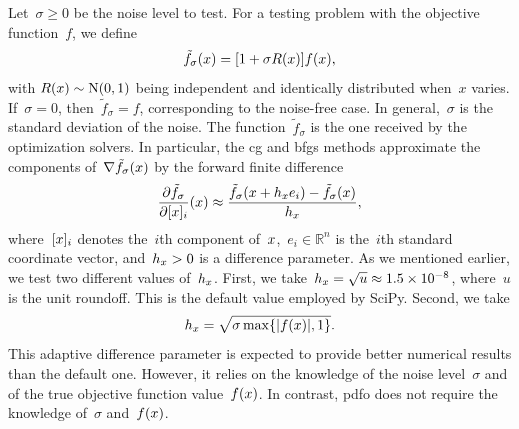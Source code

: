 \documentclass[
    smallextended,  %
    final,          %
]{svjour3}
\newcommand{\abs}[2][]{#1\lvert#2#1\rvert}
\newcommand{\set}[2][]{#1\{#2#1\}}
\newcommand{\NN}{\mathrm{N}}
\newcommand{\R}{\mathbb{R}}
\newcommand{\iter}[1][k]{x\ifthenelse{\equal{#1}{}}{}{_{#1}}}
\newcommand{\obj}{f}
\newcommand{\modified}[1]{\texorpdfstring{{\color{RoyalBlue}#1}}{#1}}
\begin{document}
Let~$\sigma \ge 0$ be the noise level to test.
For a testing problem with the objective function~$\obj$, we define
\begin{equation}
    \label{eq:noisy-obj}
    \tilde{\obj}_\sigma(\iter[]) = [1 + \sigma R(\iter[])] \obj(\iter[]),
\end{equation}
with $R(\iter[])\sim \NN(0, 1)$ being independent and identically distributed when~$x$ varies.
If~$\sigma = 0$, then~$\tilde{f}_\sigma = f$, corresponding to the noise-free case.
In general,~$\sigma$ \modified{is} the standard deviation of the noise.
\modified{
    The function~$\tilde{\obj}_\sigma$ is the one received by the optimization solvers.
    In particular, the \gls{cg} and \gls{bfgs} methods approximate the components of~$\nabla \tilde{\obj}_\sigma(\iter[])$ by the forward finite difference
    \begin{equation*}
        \frac{\partial \tilde{\obj}_\sigma}{\partial [{\iter[]}]_i}(\iter[]) \approx \frac{\tilde{\obj}_\sigma(\iter[] + h_{\iter[]} e_i) - \tilde{\obj}_\sigma(\iter[])}{h_{\iter[]}},
    \end{equation*}
    where~$[{\iter[]}]_i$ denotes the~$i$th component of~$\iter[]$,~$e_i \in \R^n$ is the~$i$th standard coordinate vector, and~$h_{\iter[]} > 0$ is a difference parameter.
    As we mentioned earlier, we test two different values of~$h_{\iter[]}$.
    First, we take~$h_{\iter[]} = \sqrt{u} \approx 1.5\times 10^{-8}$, where~$u$ is the unit roundoff.
    This is the default value employed by SciPy.
    Second, we take
    \begin{equation}
        \label{eq:adaptive-h}
        h_{\iter[]} = \sqrt{\sigma \max \set{\abs{\obj(\iter[])}, 1}}.
    \end{equation}
    This adaptive difference parameter is expected to provide better numerical results than the default one.
    However, it relies on the knowledge of the noise level~$\sigma$ and of the true objective function value~$\obj(\iter[])$.
    In contrast, \gls{pdfo} does not require the knowledge of~$\sigma$ and~$\obj(\iter[])$.
}
\end{document}
